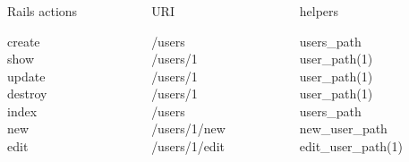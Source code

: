 

\begin{frame}
  \frametitle{\insertsection}
  \begin{columns}
    \begin{column}{2cm}
      \begin{center}Rails actions\end{center}
        create\\
        show\\
        update\\
        destroy\\
        index\\
        new\\
        edit
    \end{column}
    \begin{column}{2cm}
      \begin{center}URI\end{center}
      /users\\
      /users/1\\
      /users/1\\
      /users/1\\
      /users\\
      /users/1/new\\
      /users/1/edit
    \end{column}
    \begin{column}{2cm}
      \begin{center}helpers\end{center}
        users\_path\\
        user\_path(1)\\
        user\_path(1)\\
        user\_path(1)\\
        users\_path\\
        new\_user\_path\\
        edit\_user\_path(1)
    \end{column}
  \end{columns}
\end{frame}


